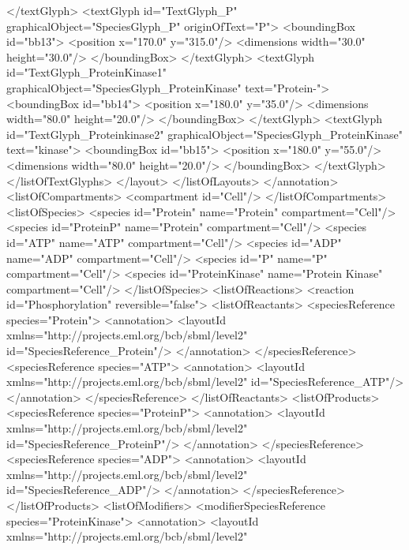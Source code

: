 {\begin{example}
      </textGlyph>
      <textGlyph id="TextGlyph_P" 
                 graphicalObject="SpeciesGlyph_P" 
                 originOfText="P">
       <boundingBox id="bb13">
        <position x="170.0" y="315.0"/>
        <dimensions width="30.0" height="30.0"/>
       </boundingBox>
      </textGlyph>
      <textGlyph id="TextGlyph_ProteinKinase1" 
                 graphicalObject="SpeciesGlyph_ProteinKinase" 
                 text="Protein-">
       <boundingBox id="bb14">
        <position x="180.0" y="35.0"/>
        <dimensions width="80.0" height="20.0"/>
       </boundingBox>
      </textGlyph>
      <textGlyph id="TextGlyph_Proteinkinase2" 
                 graphicalObject="SpeciesGlyph_ProteinKinase" 
                 text="kinase">
       <boundingBox id="bb15">
        <position x="180.0" y="55.0"/>
        <dimensions width="80.0" height="20.0"/>
       </boundingBox>
      </textGlyph>
     </listOfTextGlyphs>
    </layout>
   </listOfLayouts>
  </annotation>
  <listOfCompartments>
   <compartment id="Cell"/>
  </listOfCompartments>
  <listOfSpecies>
   <species id="Protein" name="Protein" compartment="Cell"/>
   <species id="ProteinP" name="Protein"  compartment="Cell"/>
   <species id="ATP" name="ATP" compartment="Cell"/>
   <species id="ADP" name="ADP" compartment="Cell"/>
   <species id="P" name="P" compartment="Cell"/>
   <species id="ProteinKinase" name="Protein Kinase" compartment="Cell"/>
  </listOfSpecies>
  <listOfReactions>
   <reaction id="Phosphorylation" reversible="false">
    <listOfReactants>
     <speciesReference species="Protein">
      <annotation>
       <layoutId xmlns="http://projects.eml.org/bcb/sbml/level2" 
                 id="SpeciesReference_Protein"/>
      </annotation>
     </speciesReference>
     <speciesReference species="ATP">
      <annotation>
       <layoutId xmlns="http://projects.eml.org/bcb/sbml/level2" 
                 id="SpeciesReference_ATP"/>
      </annotation>
     </speciesReference>
    </listOfReactants>
    <listOfProducts>
     <speciesReference species="ProteinP">
      <annotation>
       <layoutId xmlns="http://projects.eml.org/bcb/sbml/level2" 
                 id="SpeciesReference_ProteinP"/>
      </annotation>
     </speciesReference>
     <speciesReference species="ADP">
      <annotation>
       <layoutId xmlns="http://projects.eml.org/bcb/sbml/level2" 
                 id="SpeciesReference_ADP"/>
      </annotation>
     </speciesReference>
    </listOfProducts>
    <listOfModifiers>
     <modifierSpeciesReference species="ProteinKinase">
      <annotation>
       <layoutId xmlns="http://projects.eml.org/bcb/sbml/level2" 

\end{example}}
